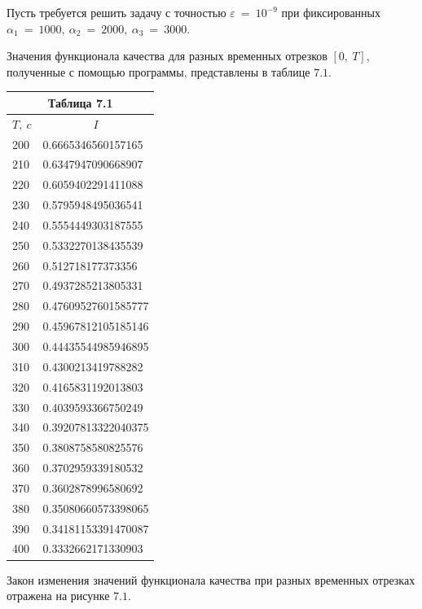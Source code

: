 \documentclass[14pt]{extreport}
\begin{document}
Пусть требуется решить задачу с точностью $\varepsilon\ =\ 10^{-9}$
при фиксированных $\alpha_1\ =\ 1000,\ \alpha_2\ =\ 2000,\ \alpha_3\ =\ 3000$. 

Значения функционала качества для разных временных отрезков $[0,\ T]$, полученные с помощью программы, представлены в таблице $7.1$.

\begin{center}
\vspace*{50px}
  \begin{tabular}{ |l|l| }
  \multicolumn{2}{c}{Таблица 7.1} \\
    \hline
    \multicolumn{1}{|c|}{$T,\ c$} & \multicolumn{1}{c|}{$I$}  \\ \hline
    200 & 0.6665346560157165  \\ \hline
    210 & 0.6347947090668907  \\ \hline
    220 & 0.6059402291411088  \\ \hline
    230 & 0.5795948495036541  \\ \hline
    240 & 0.5554449303187555  \\ \hline
    250 & 0.5332270138435539  \\ \hline
    260 & 0.512718177373356  \\ \hline
    270 & 0.4937285213805331  \\ \hline
    280 & 0.47609527601585777 \\ \hline
    290 & 0.45967812105185146  \\ \hline
    300 & 0.44435544985946895  \\ \hline
    310 & 0.4300213419788282  \\ \hline
    320 & 0.4165831192013803  \\ \hline
    330 & 0.4039593366750249  \\ \hline
    340 & 0.39207813322040375  \\ \hline
    350 & 0.3808758580825576 \\ \hline
    360 & 0.3702959339180532  \\ \hline
    370 & 0.3602878996580692  \\ \hline
    380 & 0.35080660573398065  \\ \hline
    390 & 0.34181153391470087  \\ \hline
    400 &  0.3332662171330903  \\ \hline
  \end{tabular}
\end{center}

Закон изменения значений функционала качества при разных временных отрезках отражена на рисунке $7.1$.
\end{document}
